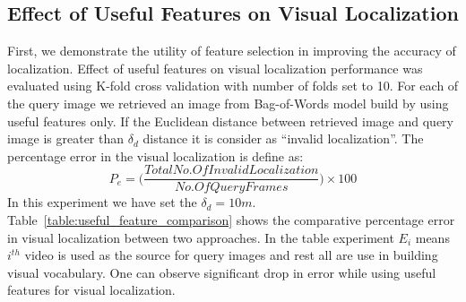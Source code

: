 \subsection{Effect of Useful Features on Visual Localization}
\label{subsec:useful_features_visual_localization}
First, we demonstrate the utility of feature selection in improving
the accuracy of localization.
Effect of useful features on visual localization performance was 
evaluated using K-fold cross validation with number of folds set to 10.
For each of the query image we retrieved an image 
from Bag-of-Words model build by using useful features only. 
If the Euclidean distance between retrieved image and 
query image is greater than $\delta_d$ distance 
it is consider as ``invalid localization''. The percentage error in the 
visual localization is define as:
\begin{equation}
P_e = \big( \frac{Total No. Of Invalid Localization}{No. Of Query Frames} \big) \times 100 
\label{eq:per_error_visual_localization}
\end{equation}
In this experiment we have set the $\delta_d=10m$. Table~\ref{table:useful_feature_comparison} shows 
the comparative percentage error in visual localization between two approaches. 
In the table experiment $E_i$ means $i^{th}$ video is used as 
the source for query images and rest all are use in building visual vocabulary.
One can observe significant drop in error while using useful
features for visual localization.
